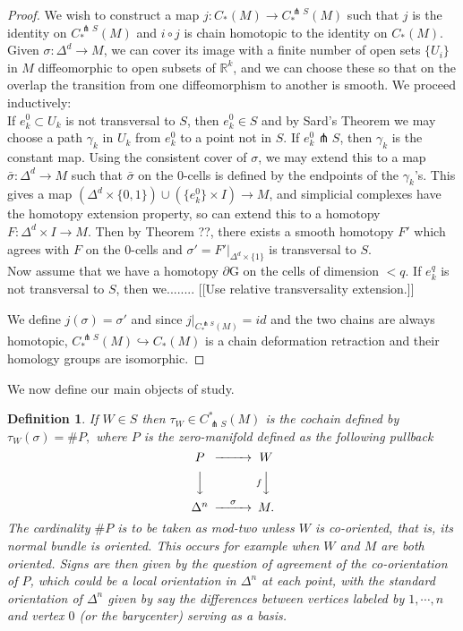 \documentclass{amsart}          %
\newtheorem{definition}[theorem]{Definition}
\newcommand{\R}{\mathbb R}
\begin{document}
\begin{proof} We wish to construct a map $j:C_{*}(M) \rightarrow C^{\pitchfork S}_{*}(M)$ such that $j$ is the identity on $C^{\pitchfork S}_{*}(M)$ and 
$i \circ j$ is chain homotopic to the identity on $C_{*}(M)$. Given $\sigma:\Delta^d \rightarrow M$, we can cover its image with a finite number of 
open sets $\{U_i\}$ in $M$ diffeomorphic to open subsets of $\R^k$, and we can choose these so that on the overlap the transition from one 
diffeomorphism to another is smooth. We proceed inductively: \\If $e^0_k \subset U_k$ is not transversal to $S$, then $e^0_k \in S$ and by 
Sard's Theorem we may choose a path $\gamma_k$ in $U_k$ from $e^0_k$ to a point not in $S$. If $e^0_k \pitchfork S$, then $\gamma_k$ is the 
constant map. Using the consistent cover of $\sigma$, we may extend this to a map $\bar{\sigma}:\Delta^d \rightarrow M$ such that $\bar{\sigma}$ 
on the 0-cells is defined by the endpoints of the $\gamma_k$'s. This gives a map 
$\left(\Delta^d \times \{0,1\} \right)\cup \left(\{e^0_k\} \times I \right)\rightarrow M$, and simplicial complexes have the homotopy extension property, 
so can extend this to a homotopy $F: \Delta^d \times I \rightarrow M$. Then by Theorem ??, there exists a smooth homotopy $F'$ which 
agrees with $F$ on the 0-cells and $\sigma'=\left.F'\right|_{\Delta^d \times \{1\}}$ is transversal to $S$.\\
Now assume that we have a homotopy $\partial$G on the cells of dimension $<q$. If $e^q_k $ is not transversal to $S$, then we........  
[[Use relative transversality
extension.]]


We define $j(\sigma) = \sigma'$ and since $\left.j\right|_{C^{\pitchfork S}_{*}(M)}=id$ and the two chains are always homotopic, $C^{\pitchfork S}_{*}(M) \hookrightarrow C_{*}(M)$ is a chain deformation retraction and their homology groups are isomorphic.
\end{proof}

We now define our main objects of study.
\begin{definition}
If $W \in S$ then $\tau_{W} \in C^{*}_{\pitchfork S}(M)$ is the cochain defined by $\tau_W (\sigma) = \# P,$  where $P$ is
the  zero-manifold defined as the following pullback
$$
\begin{CD}
P @>>> W\\
@VVV  @VfVV\\
\Delta^n @>\sigma>> M.
\end{CD}
$$
The cardinality $\# P$ is to be taken as mod-two unless $W$  is co-oriented, that is, its normal bundle is oriented.  This occurs
for example when $W$ and $M$ are both oriented.  Signs are then given by the question of agreement of the co-orientation of $P$, 
which could be a local orientation in $\Delta^n$ at each point, with the standard orientation of $\Delta^n$ given by say the differences between vertices labeled by $1, \cdots, n$ and vertex $0$ (or the barycenter) serving as a basis.
\end{definition}
\end{document}

